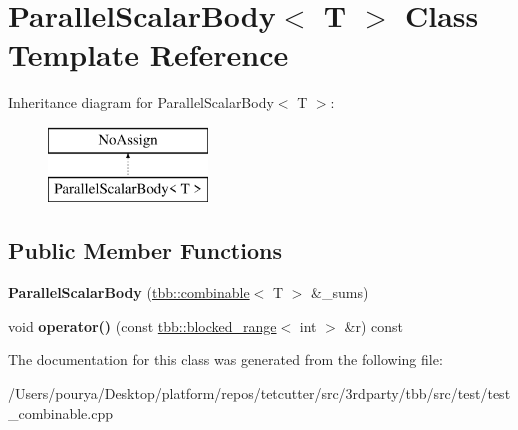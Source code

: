 \hypertarget{classParallelScalarBody}{}\section{Parallel\+Scalar\+Body$<$ T $>$ Class Template Reference}
\label{classParallelScalarBody}
Inheritance diagram for Parallel\+Scalar\+Body$<$ T $>$\+:\begin{figure}[H]
\begin{center}
\leavevmode
\includegraphics[height=2.000000cm]{classParallelScalarBody}
\end{center}
\end{figure}
\subsection*{Public Member Functions}
\begin{DoxyCompactItemize}
\item 
\hypertarget{classParallelScalarBody_ae65454dcf6a5a53474051c18fa94b8bd}{}{\bfseries Parallel\+Scalar\+Body} (\hyperlink{classtbb_1_1combinable}{tbb\+::combinable}$<$ T $>$ \&\+\_\+sums)\label{classParallelScalarBody_ae65454dcf6a5a53474051c18fa94b8bd}

\item 
\hypertarget{classParallelScalarBody_a01c34f3d4c7f78885840e26be416b42c}{}void {\bfseries operator()} (const \hyperlink{classtbb_1_1blocked__range}{tbb\+::blocked\+\_\+range}$<$ int $>$ \&r) const \label{classParallelScalarBody_a01c34f3d4c7f78885840e26be416b42c}

\end{DoxyCompactItemize}


The documentation for this class was generated from the following file\+:\begin{DoxyCompactItemize}
\item 
/\+Users/pourya/\+Desktop/platform/repos/tetcutter/src/3rdparty/tbb/src/test/test\+\_\+combinable.\+cpp\end{DoxyCompactItemize}

